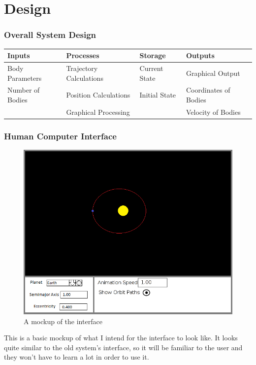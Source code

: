 \part{Design}

\section{Overall System Design}

\begin{tabular}{llll}
	Inputs & Processes & Storage & Outputs \\ \hline
	Body Parameters & Trajectory Calculations 
		& Current State & Graphical Output \\
	Number of Bodies & Position Calculations 
		& Initial State & Coordinates of Bodies \\ 
	& Graphical Processing && Velocity of Bodies \\
\end{tabular}

\section{Human Computer Interface}

\begin{figure}[h!]
	\includegraphics[width=\textwidth]{./img/interface.png}
	\caption{A mockup of the interface}
	\label{fig:hci}
\end{figure}

This is a basic mockup of what I intend for the interface to look like. It looks
quite similar to the old system's interface, so it will be familiar to the user
and they won't have to learn a lot in order to use it.

